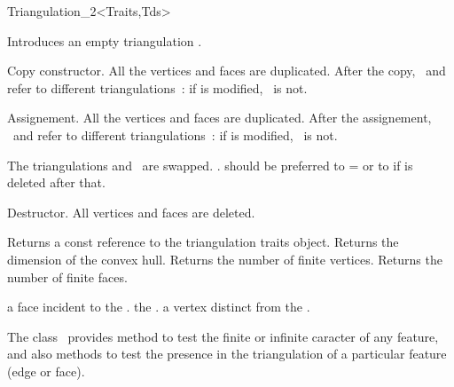 \begin{ccClassTemplate}{Triangulation_2<Traits,Tds>}
\ccCreation
{}
\ccThreeToTwo

{Introduces an empty triangulation \ccVar.}


{Copy constructor. All the vertices and faces are duplicated.
 After the copy, \ccVar\ and 
refer to different triangulations~: 
 if  is modified, \ccVar\ is not. }

{Assignement. All the vertices and faces are duplicated.
 After the assignement, \ccVar\ and 
refer to different triangulations~: 
 if  is modified, \ccVar\ is not.}

{The triangulations  and \ccVar\ are swapped.
\ccVar.  should be preferred to  =  or to
 if  is deleted after that.}


{Destructor. All vertices and faces are deleted.}


\ccAccessFunctions
{}
{Returns a const reference to the triangulation traits object.}
\ccGlue
{}
{Returns the dimension of the convex hull.}
\ccGlue
{}
{Returns the number of finite vertices.}
\ccGlue
{}
{Returns the number of finite faces.}

{a  face incident to the .}
\ccGlue
{}
{the .}
\ccGlue
{}
{a vertex distinct from  the .}


The class \ccClassTemplateName\ provides method to test
the finite or infinite caracter of any feature,
and also methods to test the presence in the triangulation
of a particular feature (edge or face).


\end{ccClassTemplate}
